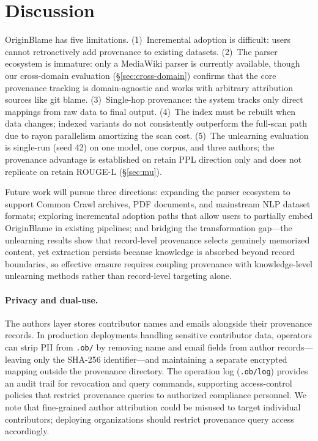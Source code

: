 \section{Discussion}
\label{sec:discussion}

OriginBlame has five limitations. (1)~Incremental adoption is difficult: users cannot retroactively add provenance to existing datasets. (2)~The parser ecosystem is immature: only a MediaWiki parser is currently available, though our cross-domain evaluation (\S\ref{sec:cross-domain}) confirms that the core provenance tracking is domain-agnostic and works with arbitrary attribution sources like git blame. (3)~Single-hop provenance: the system tracks only direct mappings from raw data to final output. (4)~The index must be rebuilt when data changes; indexed variants do not consistently outperform the full-scan path due to rayon parallelism amortizing the scan cost. (5)~The unlearning evaluation is single-run (seed 42) on one model, one corpus, and three authors; the provenance advantage is established on retain PPL direction only and does not replicate on retain ROUGE-L (\S\ref{sec:mu}).

Future work will pursue three directions: expanding the parser ecosystem to support Common Crawl archives, PDF documents, and mainstream NLP dataset formats; exploring incremental adoption paths that allow users to partially embed OriginBlame in existing pipelines; and bridging the transformation gap---the unlearning results show that record-level provenance selects genuinely memorized content, yet extraction persists because knowledge is absorbed beyond record boundaries, so effective erasure requires coupling provenance with knowledge-level unlearning methods rather than record-level targeting alone.

\paragraph{Privacy and dual-use.}
The authors layer stores contributor names and emails alongside their provenance records. In production deployments handling sensitive contributor data, operators can strip PII from \texttt{.ob/} by removing name and email fields from author records---leaving only the SHA-256 identifier---and maintaining a separate encrypted mapping outside the provenance directory. The operation log (\texttt{.ob/log}) provides an audit trail for revocation and query commands, supporting access-control policies that restrict provenance queries to authorized compliance personnel. We note that fine-grained author attribution could be misused to target individual contributors; deploying organizations should restrict provenance query access accordingly.
